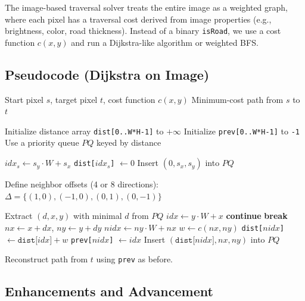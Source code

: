 \documentclass[11pt]{article}
\begin{document}
The image-based traversal solver treats the entire image as a weighted
graph, where each pixel has a traversal cost derived from image
properties (e.g., brightness, color, road thickness). Instead of a
binary \texttt{isRoad}, we use a cost function $c(x,y)$ and run a
Dijkstra-like algorithm or weighted BFS.

\subsection{Pseudocode (Dijkstra on Image)}

\begin{algorithm}[h!]
\caption{Image-Based Traversal Solver (Dijkstra)}
\begin{algorithmic}[1]
\Require Start pixel $s$, target pixel $t$, cost function $c(x,y)$
\Ensure Minimum-cost path from $s$ to $t$

\State Initialize distance array \texttt{dist[0..W*H-1]} to $+\infty$
\State Initialize \texttt{prev[0..W*H-1]} to \texttt{-1}
\State Use a priority queue $PQ$ keyed by distance

\State $idx_s \gets s_y \cdot W + s_x$
\State \texttt{dist[$idx_s$]} $\gets 0$
\State Insert $(0, s_x, s_y)$ into $PQ$

\State Define neighbor offsets (4 or 8 directions):
\State \hspace{1em} $\Delta = \{(1,0),(-1,0),(0,1),(0,-1)\}$

  \State Extract $(d,x,y)$ with minimal $d$ from $PQ$
  \State $idx \gets y \cdot W + x$
    \State \textbf{continue}
  \EndIf
    \State \textbf{break}
  \EndIf
    \State $nx \gets x + dx$, $ny \gets y + dy$
      \State $nidx \gets ny \cdot W + nx$
      \State $w \gets c(nx,ny)$
        \State \texttt{dist[$nidx$]} $\gets \texttt{dist[$idx$]} + w$
        \State \texttt{prev[$nidx$]} $\gets idx$
        \State Insert $(\texttt{dist[$nidx$]}, nx, ny)$ into $PQ$
      \EndIf
    \EndIf
  \EndFor
\EndWhile

\State Reconstruct path from $t$ using \texttt{prev} as before.
\end{algorithmic}
\end{algorithm}

\subsection{Enhancements and Advancement}
\end{document}
